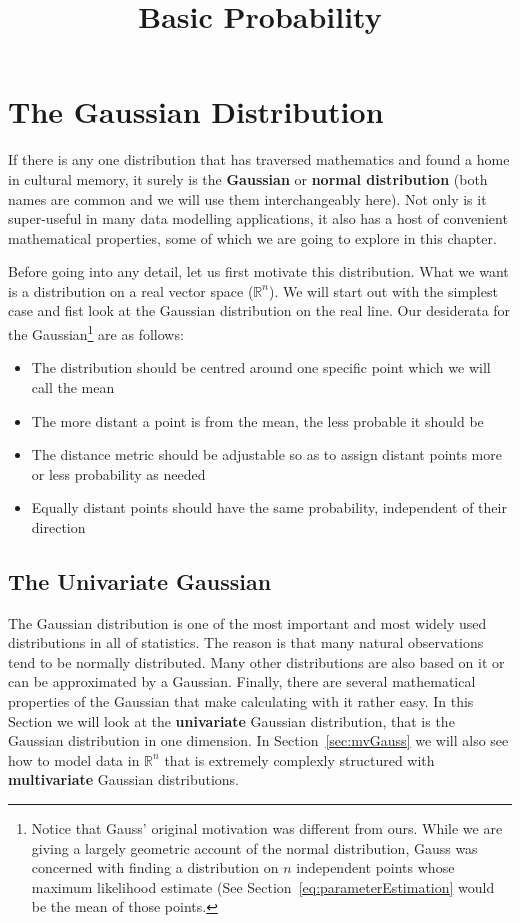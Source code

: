 \documentclass[a4paper,11pt,leqno]{report}\usepackage[]{graphicx}\usepackage[]{color}
\title{Basic Probability}
\date{}
\begin{document}
\setcounter{chapter}{5}

\chapter{The Gaussian Distribution}

If there is any one distribution that has traversed mathematics and found a home in cultural memory, it surely is the \textbf{Gaussian} or \textbf{normal distribution}
(both names are common and we will use them interchangeably here). 
Not only is it super-useful in many data modelling applications, it also has a host of convenient mathematical properties, some of which we are going
to explore in this chapter. 

Before going into any detail, let us first motivate this distribution. What we want is a distribution on a real vector space ($ \mathbb{R}^{n} $). We will
start out with the simplest case and fist look at the Gaussian distribution on the real line. Our desiderata for the Gaussian\footnote{Notice that Gauss' original
motivation was different from ours. While we are giving a largely geometric account of the normal distribution, Gauss was concerned with finding a distribution
on $ n $ independent points whose maximum likelihood estimate (See Section~\ref{eq:parameterEstimation} would be the mean of those points.} are as follows:
\begin{itemize}
\item The distribution should be centred around one specific point which we will call the mean
\item The more distant a point is from the mean, the less probable it should be
\item The distance metric should be adjustable so as to assign distant points more or less probability as needed
\item Equally distant points should have the same probability, independent of their direction
\end{itemize}

\section{The Univariate Gaussian}

The Gaussian distribution is one of the most important and most widely used distributions in all of statistics. The reason is that many natural observations
tend to be normally distributed. Many other distributions are also based on it or can be approximated by a Gaussian. Finally, there are several mathematical
properties of the Gaussian that make calculating with it rather easy. In this Section we will look at the \textbf{univariate} Gaussian distribution, that is
the Gaussian distribution in one dimension. In Section~\ref{sec:mvGauss} we will also see how to model data in $ \mathbb{R}^{n} $ that is extremely complexly 
structured with \textbf{multivariate} Gaussian distributions.
\end{document}
